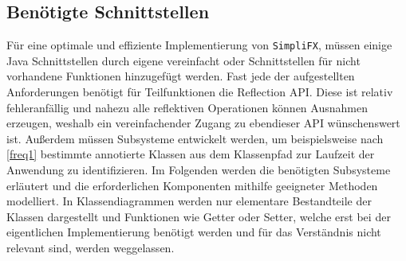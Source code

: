 \subsection{Benötigte Schnittstellen}
Für eine optimale und effiziente Implementierung von \texttt{SimpliFX}, müssen einige Java Schnittstellen durch eigene vereinfacht oder Schnittstellen für nicht vorhandene Funktionen hinzugefügt werden. Fast jede der aufgestellten Anforderungen benötigt für Teilfunktionen die Reflection API. Diese ist relativ fehleranfällig und nahezu alle reflektiven Operationen können Ausnahmen erzeugen, weshalb ein vereinfachender Zugang zu ebendieser API wünschenswert ist. Außerdem müssen Subsysteme entwickelt werden, um beispielsweise nach \autoref{freq1} bestimmte annotierte Klassen aus dem Klassenpfad zur Laufzeit der Anwendung zu identifizieren.
Im Folgenden werden die benötigten Subsysteme erläutert und die erforderlichen Komponenten mithilfe geeigneter Methoden modelliert. In Klassendiagrammen werden nur elementare Bestandteile der Klassen dargestellt und Funktionen wie Getter oder Setter, welche erst bei der eigentlichen Implementierung benötigt werden und für das Verständnis nicht relevant sind, werden weggelassen.
